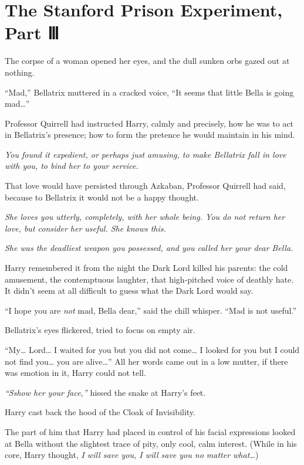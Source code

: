 \chapter{The Stanford Prison Experiment, Part
Ⅲ}\label{the-stanford-prison-experiment-part}

The corpse of a woman opened her eyes, and the dull sunken orbs gazed
out at nothing.

``Mad,'' Bellatrix muttered in a cracked voice, ``It seems that little
Bella is going mad\ldots{}''

Professor Quirrell had instructed Harry, calmly and precisely, how he
was to act in Bellatrix's presence; how to form the pretence he would
maintain in his mind.

\emph{You found it expedient, or perhaps just amusing, to make Bellatrix
fall in love with you, to bind her to your service.}

That love would have persisted through Azkaban, Professor Quirrell had
said, because to Bellatrix it would not be a happy thought.

\emph{She loves you utterly, completely, with her whole being. You do
not return her love, but consider her useful. She knows this.}

\emph{She was the deadliest weapon you possessed, and you called her
your dear Bella.}

Harry remembered it from the night the Dark Lord killed his parents: the
cold amusement, the contemptuous laughter, that high-pitched voice of
deathly hate. It didn't seem at all difficult to guess what the Dark
Lord would say.

``I hope you are \emph{not} mad, Bella dear,'' said the chill whisper.
``Mad is not useful.''

Bellatrix's eyes flickered, tried to focus on empty air.

``My\ldots{} Lord\ldots{} I waited for you but you did not come\ldots{}
I looked for you but I could not find you\ldots{} you are
alive\ldots{}'' All her words came out in a low mutter, if there was
emotion in it, Harry could not tell.

\emph{``Sshow her your face,''} hissed the snake at Harry's feet.

Harry cast back the hood of the Cloak of Invisibility.

The part of him that Harry had placed in control of his facial
expressions looked at Bella without the slightest trace of pity, only
cool, calm interest. (While in his core, Harry thought, \emph{I will
save you, I will save you no matter what\ldots{}})

